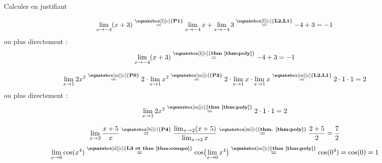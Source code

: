 \documentclass[a4paper,12pt]{article}
\begin{document}
\begin{exemple}
	\tcblower
Calculer en justifiant 
\begin{tasks}
	\task
\[
\lim_{x\to-4}(x+3)
\stackrel{\text{\eqmakebox[l][c]{{\bfseries{P1}}}}}{=}
\lim_{x\to-4}x+\lim_{x\to-4}3
\stackrel{\text{\eqmakebox[l][c]{{\bfseries{L2,L1}}}}}{=}
-4+3=-1
\]
ou plus directement :
\[
\lim_{x\to-4}(x+3)
\stackrel{\text{\eqmakebox[l][c]{{\bfseries{thm \ref{thm:poly}}}}}}{=}
-4+3=-1
\]


\task 

\[
\lim_{x\to1}2x^2
\stackrel{\text{\eqmakebox[m][c]{{\bfseries{P0}}}}}{=}
2\cdot\lim_{x\to1}x^2
\stackrel{\text{\eqmakebox[m][c]{{\bfseries{P3}}}}}{=}
2\cdot\lim_{x\to1}x\cdot\lim_{x\to1}x
\stackrel{\text{\eqmakebox[m][c]{{\bfseries{L2,L1}}}}}{=}
2\cdot1\cdot1=2
\]
ou plus directement :
\[
\lim_{x\to1}2x^2
\stackrel{\text{\eqmakebox[m][c]{{\bfseries{thm \ref{thm:poly}}}}}}{=}
2\cdot1\cdot1=2
\]
\end{tasks}
\end{exemple}
\begin{exemplesuite}
	\begin{tasks}
		\task[c)]
\[
\lim_{x\to2}\dfrac{x+5}{x}
\stackrel{\text{\eqmakebox[b][c]{{\bfseries{P4}}}}}{=}
\dfrac{\lim_{x\to2}(x+5)}{\lim_{x\to2}x}
\stackrel{\text{\eqmakebox[m][c]{{\bfseries thm. \ref{thm:poly}}}}}{=}
\dfrac{2+5}{2}
=\dfrac{7}{2}
\]
\task[d)]
\[
\lim_{x\to0}\cos(x^4)
\stackrel{\text{\eqmakebox[d][c]{{\bfseries{L3 et thm \ref{thm:compo}}}}}}{=}
\cos\bigl(\lim_{x\to0}x^4\bigr)
\stackrel{\text{\eqmakebox[m][c]{{\bfseries thm \ref{thm:poly}}}}}{=}
\cos(0^4)=\cos(0)=1
\]
\end{tasks}
\end{exemplesuite}
\end{document}
